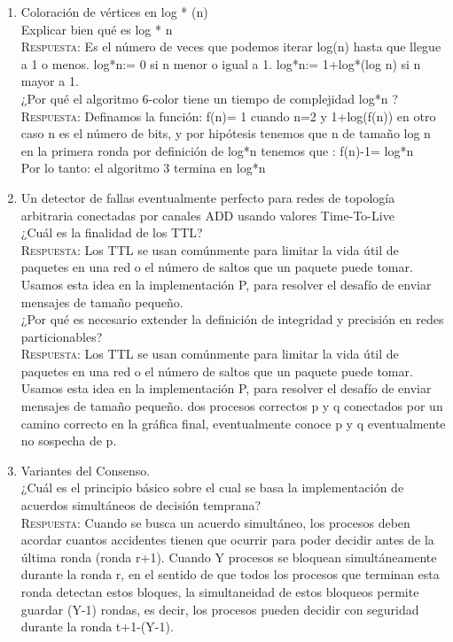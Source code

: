 \documentclass[letterpaper,10pt]{article}
\begin{document}
\begin{enumerate}
    \item Coloración de vértices en log * (n)\\

	Explicar bien qué es log * n\\
    \textsc{Respuesta:}
    Es el número de veces que podemos iterar log(n) hasta que llegue a 1 o menos.
log*n:= 0 si n menor o igual a 1.
log*n:= 1+log*(log n) si n mayor a 1.\\
    
    ¿Por qué el algoritmo 6-color tiene un tiempo de complejidad log*n ?\\
    \textsc{Respuesta:}
    Definamos la función: f(n)= 1 cuando n=2 y 1+log(f(n)) en otro caso n es el número de bits, y por hipótesis tenemos que n de tamaño log n en la primera ronda por definición de log*n tenemos que : f(n)-1= log*n\\
Por lo tanto: el algoritmo 3 termina en log*n\\

    \item  Un detector de fallas eventualmente perfecto para redes de topología arbitraria conectadas por canales ADD usando valores Time-To-Live\\

	¿Cuál es la finalidad de los TTL?\\
    \textsc{Respuesta:}
    Los TTL se usan comúnmente para limitar la vida útil de paquetes en una red o el número de saltos que un paquete puede tomar. Usamos esta idea en la implementación P, para resolver el desafío de enviar mensajes de tamaño pequeño. \\
    
    ¿Por qué es necesario extender la definición de integridad y precisión en redes particionables?\\
    \textsc{Respuesta:}
    Los TTL se usan comúnmente para limitar la vida útil de paquetes en una red o el número de saltos que un paquete puede tomar. Usamos esta idea en la implementación P, para resolver el desafío de enviar mensajes de tamaño pequeño.
dos procesos correctos p y q conectados por un camino correcto en la gráfica final,  eventualmente conoce p y q eventualmente no sospecha de p.\\
    
    \item Variantes del Consenso.\\

	¿Cuál es el principio básico sobre el cual se basa la implementación de acuerdos simultáneos de decisión temprana?\\
    \textsc{Respuesta:}
    Cuando se busca un acuerdo simultáneo, los procesos deben acordar cuantos accidentes tienen que ocurrir para poder decidir antes de la última ronda (ronda r+1). Cuando Y procesos se bloquean simultáneamente durante la ronda r, en el sentido de que todos los procesos que terminan esta ronda detectan estos bloques, la simultaneidad de estos bloqueos permite guardar (Y-1) rondas, es decir, los procesos pueden decidir con seguridad durante la ronda t+1-(Y-1). \\
    

\end{enumerate}
\end{document}
